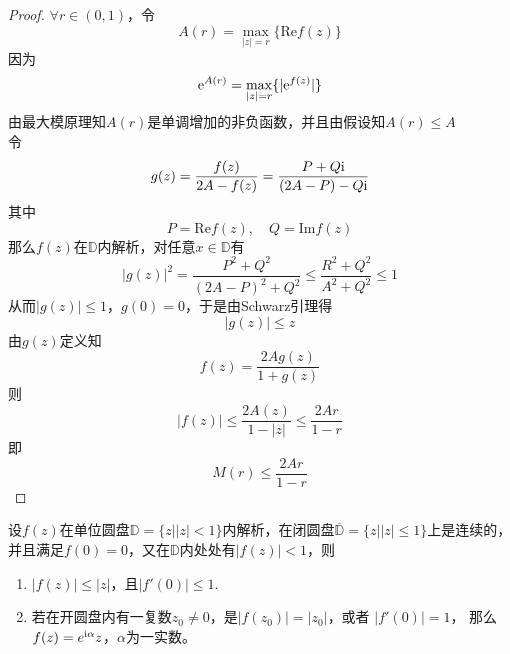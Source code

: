 \begin{proof}
    
    $\forall r \in (0, 1)$，令
    $$A(r) = \max_{|z| = r}\{\mathrm{Re}f(z)\}$$
    因为
    $$\mathrm{e}^{A(r)} = \max_{|z| = r}\{|\mathrm{e}^{f(z)}|\}$$
    由最大模原理知$A(r)$是单调增加的非负函数，并且由假设知$A(r) \leq A$ \\
    令
    $$ g(z) = \dfrac{f(z)}{2A - f(z)} = \dfrac{P + Q\mathrm{i}}{(2A - P) - Q\mathrm{i}} $$
    其中
    $$ P = \mathrm{Re}f(z), \quad Q = \mathrm{Im}f(z) $$
    那么$f(z)$在$\mathbb{D}$内解析，对任意$x \in \mathbb{D}$有
    $$|g(z)|^2 = \dfrac{P^2 + Q^2}{(2A - P)^2 + Q^2} \leq \dfrac{R^2 + Q^2}{A^2 + Q^2} \leq 1$$
    从而$|g(z)| \leq 1$，$g(0) = 0$，于是由\textup{Schwarz}引理得
    $$|g(z) | \leq z$$
    由$g(z)$定义知
    $$f(z) = \dfrac{2Ag(z)}{1 + g(z)}$$
    则
    $$ |f(z)| \leq \dfrac{2A(z)}{1 - |z|} \leq \dfrac{2Ar}{1 - r}$$
    即
    $$M(r) \leq \dfrac{2Ar}{1 - r}$$

\end{proof}

\begin{lemma}[Schwarz引理]
    
    设$f(z)$在单位圆盘$\mathbb{D} = \{z \big| |z| < 1\}$内解析，在闭圆盘$\overline{\mathbb{D}} = \{z \big| |z| \leq 1\}$上是连续的，并且满足$f(0) = 0$，又在$\mathbb{D}$内处处有$|f(z)| < 1$，则

    \begin{enumerate}
        
        \item $|f(z)| \leq |z|$，且$|f'(0)| \leq 1$.
            
        \item 
            若在开圆盘内有一复数$z_0 \neq 0$，是$|f(z_0)| = |z_0|$，或者 $|f'(0)| = 1$，
            那么$f(z) = e^{\mathrm{i}\alpha}z$，$\alpha$为一实数。
        
    \end{enumerate}

\end{lemma}

